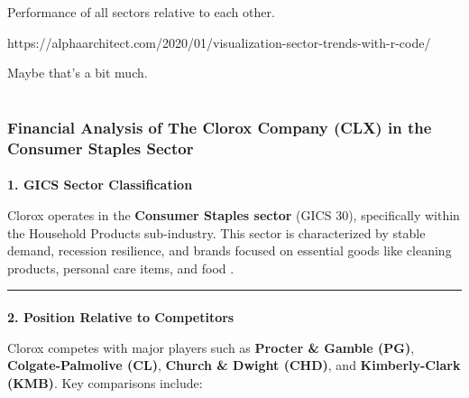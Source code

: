\documentclass[
  letterpaper,
  DIV=11,
  numbers=noendperiod]{scrartcl}
\makeatletter
\let\oldparagraph\paragraph
\renewcommand{\paragraph}{
    \@ifstar
      \xxxParagraphStar
      \xxxParagraphNoStar
  }
\newcommand{\xxxParagraphStar}[1]{\oldparagraph*{#1}\mbox{}}
\newcommand{\xxxParagraphNoStar}[1]{\oldparagraph{#1}\mbox{}}
\makeatother
\begin{document}
Performance of all sectors relative to each other.

https://alphaarchitect.com/2020/01/visualization-sector-trends-with-r-code/

Maybe that's a bit much.

\section{}\label{section-1}

\subsubsection{Financial Analysis of The Clorox Company (CLX) in the
Consumer Staples
Sector}\label{financial-analysis-of-the-clorox-company-clx-in-the-consumer-staples-sector}

\paragraph{\texorpdfstring{\textbf{1. GICS Sector
Classification}}{1. GICS Sector Classification}}\label{gics-sector-classification}

Clorox operates in the \textbf{Consumer Staples sector} (GICS 30),
specifically within the Household Products sub-industry. This sector is
characterized by stable demand, recession resilience, and brands focused
on essential goods like cleaning products, personal care items, and food
.

\begin{center}\rule{0.5\linewidth}{0.5pt}\end{center}

\paragraph{\texorpdfstring{\textbf{2. Position Relative to
Competitors}}{2. Position Relative to Competitors}}\label{position-relative-to-competitors}

Clorox competes with major players such as \textbf{Procter \& Gamble
(PG)}, \textbf{Colgate-Palmolive (CL)}, \textbf{Church \& Dwight (CHD)},
and \textbf{Kimberly-Clark (KMB)}. Key comparisons include:
\end{document}
